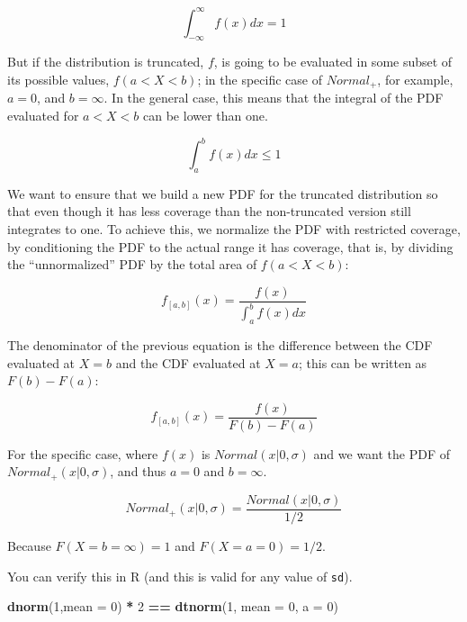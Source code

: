 \documentclass[12pt,]{krantz}
\newenvironment{Shaded}{\begin{snugshade}}{\end{snugshade}}
\newcommand{\DataTypeTok}[1]{\textcolor[rgb]{0.13,0.29,0.53}{#1}}
\newcommand{\DecValTok}[1]{\textcolor[rgb]{0.00,0.00,0.81}{#1}}
\newcommand{\KeywordTok}[1]{\textcolor[rgb]{0.13,0.29,0.53}{\textbf{#1}}}
\newcommand{\NormalTok}[1]{#1}
\newcommand{\OperatorTok}[1]{\textcolor[rgb]{0.81,0.36,0.00}{\textbf{#1}}}
\newcommand{\StringTok}[1]{\textcolor[rgb]{0.31,0.60,0.02}{#1}}
\theoremstyle{definition}
\theoremstyle{definition}
\theoremstyle{definition}
\theoremstyle{remark}
\begin{document}
\begin{equation}
\int_{-\infty}^{\infty} f(x) dx = 1
\end{equation}

But if the distribution is truncated, \(f\), is going to be evaluated in some subset of its possible values, \(f(a <X < b)\); in the specific case of \(Normal_+\), for example, \(a = 0\), and \(b=\infty\). In the general case, this means that the integral of the PDF evaluated for \(a <X < b\) can be lower than one.

\begin{equation}
\int_{a}^{b} f(x) dx \leq 1
\end{equation}

We want to ensure that we build a new PDF for the truncated distribution so that even though it has less coverage than the non-truncated version still integrates to one. To achieve this, we normalize the
PDF with restricted coverage, by conditioning the PDF to the actual range it has coverage, that is, by dividing the ``unnormalized'' PDF by the total area of \(f(a <X < b)\):

\begin{equation}
f_{[a,b]}(x) = \frac{f(x)}{\int_{a}^{b} f(x) dx}
\end{equation}

The denominator of the previous equation is the difference between the CDF evaluated at \(X = b\) and the CDF evaluated at \(X =a\); this can be written as \(F(b) - F(a)\):

\begin{equation}
f_{[a,b]}(x) = \frac{f(x)}{F(b) - F(a)}
\label{eq:truncPDF}
\end{equation}

For the specific case, where \(f(x)\) is \(Normal(x | 0, \sigma)\) and we want the PDF of \(Normal_+(x | 0, \sigma)\), and thus \(a= 0\) and \(b =\infty\).

\begin{equation}
Normal_+(x |0, \sigma) = \frac{Normal(x | 0, \sigma)}{1/2}
\end{equation}

Because \(F(X= b =\infty) = 1\) and \(F(X = a = 0) = 1/2\).

You can verify this in R (and this is valid for any value of \texttt{sd}).

\begin{Shaded}
\begin{Highlighting}[]
\KeywordTok{dnorm}\NormalTok{(}\DecValTok{1}\NormalTok{,}\DataTypeTok{mean =} \DecValTok{0}\NormalTok{) }\OperatorTok{*}\StringTok{ }\DecValTok{2} \OperatorTok{==}\StringTok{ }\KeywordTok{dtnorm}\NormalTok{(}\DecValTok{1}\NormalTok{, }\DataTypeTok{mean =} \DecValTok{0}\NormalTok{, }\DataTypeTok{a =} \DecValTok{0}\NormalTok{)}
\end{Highlighting}
\end{Shaded}
\end{document}
